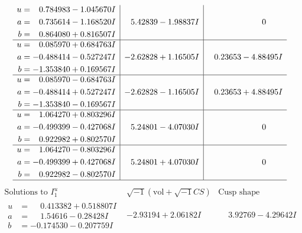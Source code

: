 \documentclass[1p]{elsarticle_modified}
\theoremstyle{definition}
\newcommand{\I}{\sqrt{-1}}
\begin{document}
$$\begin{array}{c|c|c}
\begin{aligned}
u &= \phantom{-}0.784983 - 1.045670 I \\
a &= \phantom{-}0.735614 - 1.168520 I \\
b &= \phantom{-}0.864080 + 0.816507 I\end{aligned}
 & \phantom{-}5.42839 - 1.98837 I & \phantom{-0.000000 } 0 \\ \hline\begin{aligned}
u &= \phantom{-}0.085970 + 0.684763 I \\
a &= -0.488414 - 0.527247 I \\
b &= -1.353840 + 0.169567 I\end{aligned}
 & -2.62828 + 1.16505 I & \phantom{-}0.23653 - 4.88495 I \\ \hline\begin{aligned}
u &= \phantom{-}0.085970 - 0.684763 I \\
a &= -0.488414 + 0.527247 I \\
b &= -1.353840 - 0.169567 I\end{aligned}
 & -2.62828 - 1.16505 I & \phantom{-}0.23653 + 4.88495 I \\ \hline\begin{aligned}
u &= \phantom{-}1.064270 + 0.803296 I \\
a &= -0.499399 - 0.427068 I \\
b &= \phantom{-}0.922982 + 0.802570 I\end{aligned}
 & \phantom{-}5.24801 - 4.07030 I & \phantom{-0.000000 } 0 \\ \hline\begin{aligned}
u &= \phantom{-}1.064270 - 0.803296 I \\
a &= -0.499399 + 0.427068 I \\
b &= \phantom{-}0.922982 - 0.802570 I\end{aligned}
 & \phantom{-}5.24801 + 4.07030 I & \phantom{-0.000000 } 0\\
 \hline 
 \end{array}$$\newpage$$\begin{array}{c|c|c}  
\text{Solutions to }I^u_{1}& \I (\text{vol} + \sqrt{-1}CS) & \text{Cusp shape}\\
 \hline 
\begin{aligned}
u &= \phantom{-}0.413382 + 0.518807 I \\
a &= \phantom{-}1.54616 - 0.28428 I \\
b &= -0.174530 - 0.207759 I\end{aligned}
 & -2.93194 + 2.06182 I & \phantom{-}3.92769 - 4.29642 I \\ \hline\begin{aligned}

\end{aligned}
\end{array}$$
\end{document}
